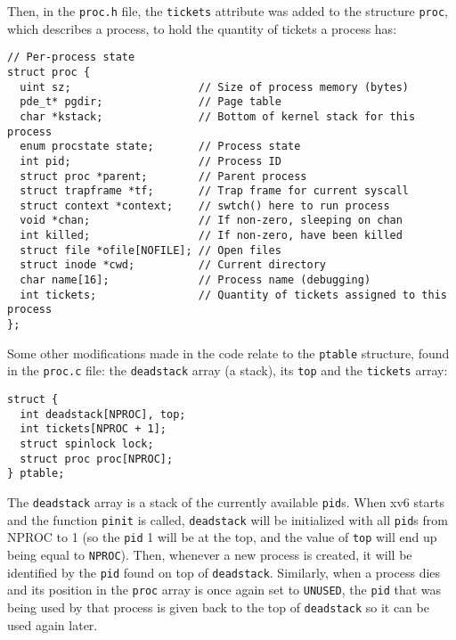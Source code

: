 \documentclass[12pt]{article}
\begin{document}
Then, in the \texttt{proc.h} file, the \texttt{tickets} attribute was added to the structure \texttt{proc}, which describes a process, to hold the quantity of tickets a process has:

\begin{scriptsize}
\begin{verbatim}
// Per-process state
struct proc {
  uint sz;                    // Size of process memory (bytes)
  pde_t* pgdir;               // Page table
  char *kstack;               // Bottom of kernel stack for this process
  enum procstate state;       // Process state
  int pid;                    // Process ID
  struct proc *parent;        // Parent process
  struct trapframe *tf;       // Trap frame for current syscall
  struct context *context;    // swtch() here to run process
  void *chan;                 // If non-zero, sleeping on chan
  int killed;                 // If non-zero, have been killed
  struct file *ofile[NOFILE]; // Open files
  struct inode *cwd;          // Current directory
  char name[16];              // Process name (debugging)
  int tickets;                // Quantity of tickets assigned to this process
};
\end{verbatim}
\end{scriptsize}

Some other modifications made in the code relate to the \texttt{ptable} structure, found in the \texttt{proc.c} file: the \texttt{deadstack} array (a stack), its \texttt{top} and the \texttt{tickets} array:

\begin{scriptsize}
\begin{verbatim}
struct {
  int deadstack[NPROC], top;
  int tickets[NPROC + 1];
  struct spinlock lock;
  struct proc proc[NPROC];
} ptable;
\end{verbatim}
\end{scriptsize}

The \texttt{deadstack} array is a stack of the currently available \texttt{pid}s. When xv6 starts and the function \texttt{pinit} is called, \texttt{deadstack} will be initialized with all \texttt{pid}s from NPROC to 1 (so the \texttt{pid} 1 will be at the top, and the value of \texttt{top} will end up being equal to \texttt{NPROC}). Then, whenever a new process is created, it will be identified by the \texttt{pid} found on top of \texttt{deadstack}. Similarly, when a process dies and its position in the \texttt{proc} array is once again set to \texttt{UNUSED}, the \texttt{pid} that was being used by that process is given back to the top of \texttt{deadstack} so it can be used again later.
\end{document}
